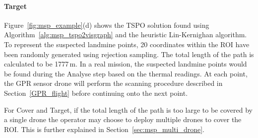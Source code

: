 \paragraph{Target} Figure~\ref{fig:msp_example}(d) shows the \gls{TSPO} solution found using Algorithm~\ref{alg:msp_tspo2visgraph} and the heuristic Lin-Kernighan algorithm. To represent the suspected landmine points, 20 coordinates within the \gls{ROI} have been randomly generated using rejection sampling. The total length of the path is calculated to be 1777\,m. In a real mission, the suspected landmine points would be found during the Analyse step based on the thermal readings. At each point, the \gls{GPR} sensor drone will perform the scanning procedure described in Section~\ref{GPR_flight} before continuing onto the next point. 

For Cover and Target, if the total length of the path is too large to be covered by a single drone the operator may choose to deploy multiple drones to cover the \gls{ROI}. This is further explained in Section~\ref{sec:msp_multi_drone}. 

